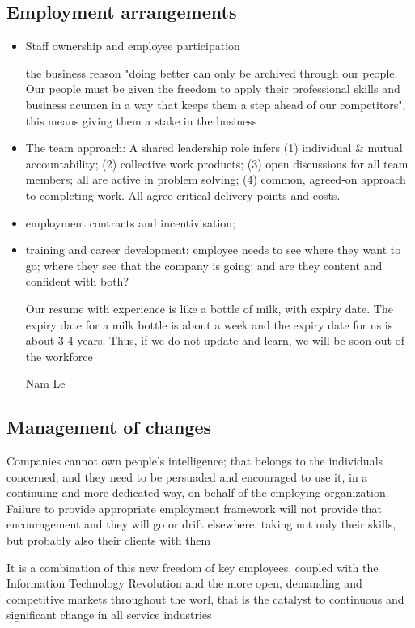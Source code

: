 \documentclass[a4paper,twoside,11pt]{article}
\begin{document}
\subsection{Employment arrangements}
\begin{itemize}
\item Staff ownership and employee participation
\epigraph{the business reason "doing better can only be archived through our people. Our people must be given the freedom to apply their professional skills and business acumen in a way that keeps them a step ahead of our competitors", this means giving them a stake in the business}{}
\item The team approach: A shared leadership role infers (1) individual \& mutual accountability; (2) collective work products; (3) open discussions for all team members; all are active in problem solving; (4) common, agreed-on approach to completing work. All agree critical delivery points and costs.

\item employment contracts and incentivisation;

\item training and career development: employee needs to see where they want to go; where they see that the company is going; and are they content and confident with both?

\epigraph{Our resume with experience is like a bottle of milk, with expiry date. The expiry date for a milk bottle is about a week and the expiry date for us is about 3-4 years. Thus, if we do not update and learn, we will be soon out of the workforce}{Nam Le}
\end{itemize}

\subsection{Management of changes}
\epigraph{Companies cannot own people's intelligence; that belongs to the individuals concerned, and they need to be persuaded and encouraged to use it, in a continuing and more dedicated way, on behalf of the employing organization. Failure to provide appropriate employment framework will not provide that encouragement and they will go or drift elsewhere, taking not only their skills, but probably also their clients with them}{}

\epigraph{It is a combination of this new freedom of key employees, coupled with the Information Technology Revolution and the more open, demanding and competitive markets throughout the worl, that is the catalyst to continuous and significant change in all service industries}{}
\end{document}
